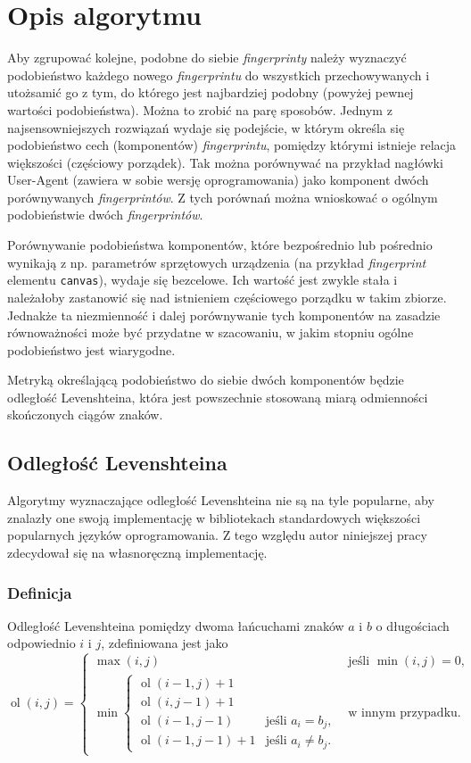 \section{Opis algorytmu}
Aby zgrupować kolejne, podobne do siebie \emph{fingerprinty} należy wyznaczyć
podobieństwo każdego nowego \emph{fingerprintu} do wszystkich przechowywanych i
utożsamić go z tym, do którego jest najbardziej podobny (powyżej pewnej wartości
podobieństwa). Można to zrobić na parę sposobów. Jednym z najsensowniejszych
rozwiązań wydaje się podejście, w którym określa się podobieństwo cech
(komponentów) \emph{fingerprintu}, pomiędzy którymi istnieje relacja większości
(częściowy porządek). Tak można porównywać na przykład nagłówki User-Agent
(zawiera w sobie wersję oprogramowania) jako komponent dwóch porównywanych
\emph{fingerprintów}. Z tych porównań można wnioskować o ogólnym podobieństwie
dwóch \emph{fingerprintów}.

Porównywanie podobieństwa komponentów, które bezpośrednio lub pośrednio wynikają
z np. parametrów sprzętowych urządzenia (na przykład \emph{fingerprint} elementu
\texttt{canvas}), wydaje się bezcelowe. Ich wartość jest zwykle stała i
należałoby zastanowić się nad istnieniem częściowego porządku w takim zbiorze.
Jednakże ta niezmienność i dalej porównywanie tych komponentów na zasadzie
równoważności może być przydatne w szacowaniu, w jakim stopniu ogólne
podobieństwo jest wiarygodne.

Metryką określającą podobieństwo do siebie dwóch komponentów będzie odległość
Levenshteina, która jest powszechnie stosowaną miarą odmienności skończonych
ciągów znaków.

\subsection{Odległość Levenshteina}
Algorytmy wyznaczające odległość Levenshteina nie są na tyle popularne, aby
znalazły one swoją implementację w bibliotekach standardowych większości
popularnych języków oprogramowania. Z tego względu autor niniejszej pracy
zdecydował się na własnoręczną implementację.

\subsubsection{Definicja}
Odległość Levenshteina pomiędzy dwoma łańcuchami znaków \(a\) i \(b\) o
długościach odpowiednio \(i\) i \(j\), zdefiniowana jest jako
\begin{displaymath}
	\operatorname{ol}(i,j)=
	\begin{cases}
		\max(i,j)                    & \text{jeśli }\min(i,j)=0,  \\
		\min
		\begin{cases}
		\operatorname{ol}(i-1,j)+1 \\
		\operatorname{ol}(i,j-1)+1 \\
		\operatorname{ol}(i-1,j-1)   & \text{jeśli }a_i=b_j,      \\
		\operatorname{ol}(i-1,j-1)+1 & \text{jeśli }a_i \neq b_j. 
	\end{cases} & \text{w innym przypadku}.
	\end{cases}
\end{displaymath}


